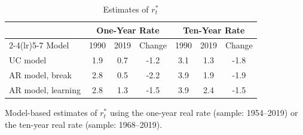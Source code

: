 \begin{table}[!htbp]
\centering
\caption{Estimates of $r_t^{*}$}
\label{tab:rstar_estimates}
\begin{threeparttable}
\setlength{\tabcolsep}{8pt}
\begin{tabular}{lcccccc}
\toprule\toprule
 & \multicolumn{3}{c}{One-Year Rate} & \multicolumn{3}{c}{Ten-Year Rate} \\
\cmidrule(lr){2-4}\cmidrule(lr){5-7}
Model & 1990 & 2019 & Change & 1990 & 2019 & Change \\
\midrule
UC model & 1.9 & 0.7 & -1.2 & 3.1 & 1.3 & -1.8 \\
AR model, break & 2.8 & 0.5 & -2.2 & 3.9 & 1.9 & -1.9 \\
AR model, learning & 2.8 & 1.3 & -1.5 & 3.9 & 2.4 & -1.5 \\
\bottomrule
\end{tabular}
\begin{tablenotes}[flushleft]
\footnotesize
\item Model-based estimates of $r_t^{*}$ using the one-year real rate (sample: 1954--2019) or the ten-year real rate (sample: 1968--2019).
\end{tablenotes}
\end{threeparttable}
\end{table}
